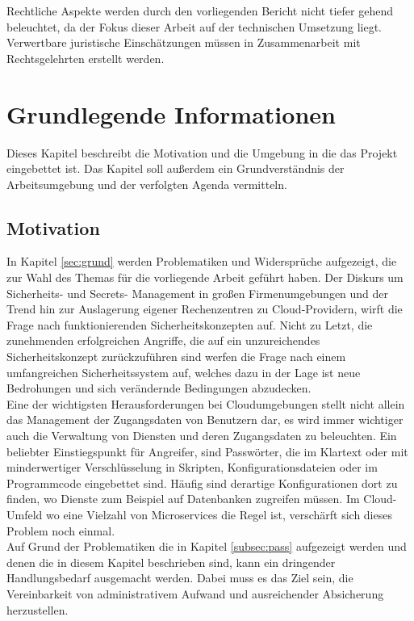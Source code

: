 \documentclass[
book,
a4paper,   
titlepage,  
halfparskip,
12pt        
]{scrartcl}
\begin{document}
\begin{onehalfspacing}
Rechtliche Aspekte werden durch den vorliegenden Bericht nicht tiefer gehend beleuchtet, da der Fokus dieser Arbeit auf der technischen Umsetzung liegt. Verwertbare juristische Einschätzungen müssen in Zusammenarbeit mit Rechtsgelehrten erstellt werden.

\newpage
\section{Grundlegende Informationen}
\label{sec:inf}
Dieses Kapitel beschreibt die Motivation und die Umgebung in die das Projekt eingebettet ist. Das Kapitel soll außerdem ein Grundverständnis der Arbeitsumgebung und der verfolgten Agenda vermitteln.

\subsection{Motivation}
In Kapitel \vref{sec:grund} werden Problematiken und Widersprüche aufgezeigt, die zur Wahl des Themas für die vorliegende Arbeit geführt haben. Der Diskurs um Sicherheits- und Secrets- Management in großen Firmenumgebungen und der Trend hin zur Auslagerung eigener Rechenzentren zu Cloud-Providern, wirft die Frage nach funktionierenden Sicherheitskonzepten auf. Nicht zu Letzt, die zunehmenden erfolgreichen Angriffe, die auf ein unzureichendes Sicherheitskonzept zurückzuführen sind werfen die Frage nach einem umfangreichen Sicherheitssystem auf, welches dazu in der Lage ist neue Bedrohungen und sich verändernde Bedingungen abzudecken.\\
Eine der wichtigsten Herausforderungen bei Cloudumgebungen stellt nicht allein das Management der Zugangsdaten von Benutzern dar, es wird immer wichtiger auch die Verwaltung von Diensten und deren Zugangsdaten zu beleuchten. Ein beliebter Einstiegspunkt für Angreifer, sind Passwörter, die im Klartext oder mit minderwertiger Verschlüsselung in Skripten, Konfigurationsdateien oder im Programmcode eingebettet sind. Häufig sind derartige Konfigurationen dort zu finden, wo Dienste zum Beispiel auf Datenbanken zugreifen müssen. Im Cloud-Umfeld wo eine Vielzahl von Microservices die Regel ist, verschärft sich dieses Problem noch einmal.\\
Auf Grund der Problematiken die in Kapitel \vref{subsec:pass} aufgezeigt werden und denen die in diesem Kapitel beschrieben sind, kann ein dringender Handlungsbedarf ausgemacht werden. Dabei muss es das Ziel sein, die Vereinbarkeit von administrativem Aufwand und ausreichender Absicherung herzustellen. 


\end{onehalfspacing}
\end{document}

